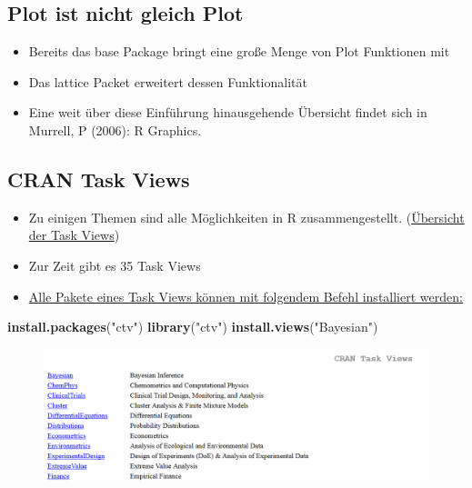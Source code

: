 \documentclass[]{article}
\newenvironment{Shaded}{\begin{snugshade}}{\end{snugshade}}
\newcommand{\KeywordTok}[1]{\textcolor[rgb]{0.13,0.29,0.53}{\textbf{{#1}}}}
\newcommand{\StringTok}[1]{\textcolor[rgb]{0.31,0.60,0.02}{{#1}}}
\newcommand{\NormalTok}[1]{{#1}}
\providecommand{\tightlist}{%
  \setlength{\itemsep}{0pt}\setlength{\parskip}{0pt}}
\begin{document}
\subsection{Plot ist nicht gleich
Plot}\label{plot-ist-nicht-gleich-plot}

\begin{itemize}
\tightlist
\item
  Bereits das base Package bringt eine große Menge von Plot Funktionen
  mit
\item
  Das lattice Packet erweitert dessen Funktionalität
\item
  Eine weit über diese Einführung hinausgehende Übersicht findet sich in
  Murrell, P (2006): R Graphics.
\end{itemize}

\subsection{CRAN Task Views}\label{cran-task-views}

\begin{itemize}
\tightlist
\item
  Zu einigen Themen sind alle Möglichkeiten in R zusammengestellt.
  (\href{https://cran.r-project.org/web/views/}{Übersicht der Task
  Views})
\item
  Zur Zeit gibt es 35 Task Views
\item
  \href{https://mran.microsoft.com/rpackages/}{Alle Pakete eines Task
  Views können mit folgendem Befehl installiert werden:}
\end{itemize}

\begin{Shaded}
\begin{Highlighting}[]
\KeywordTok{install.packages}\NormalTok{(}\StringTok{"ctv"}\NormalTok{)}
\KeywordTok{library}\NormalTok{(}\StringTok{"ctv"}\NormalTok{)}
\KeywordTok{install.views}\NormalTok{(}\StringTok{"Bayesian"}\NormalTok{)}
\end{Highlighting}
\end{Shaded}

\begin{figure}[htbp]
\centering
\includegraphics{figure/CRANtaskViews.PNG}
\caption{}
\end{figure}
\end{document}
